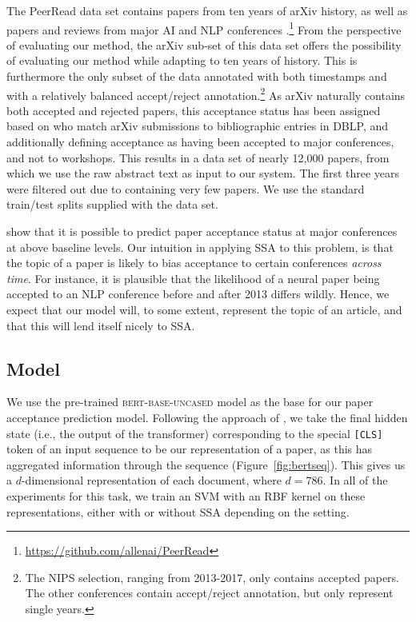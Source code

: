 \documentclass[letterpaper]{article} %
\begin{document}
The PeerRead data set contains papers from ten years of arXiv history, as well as papers and reviews from major AI and NLP conferences \cite{kang18naacl}.\footnote{\url{https://github.com/allenai/PeerRead}} 
From the perspective of evaluating our method, the arXiv sub-set of this data set offers the possibility of evaluating our method while adapting to ten years of history.
This is furthermore the only subset of the data annotated with both timestamps and with a relatively balanced accept/reject annotation.\footnote{The NIPS selection, ranging from 2013-2017, only contains accepted papers. The other conferences contain accept/reject annotation, but only represent single years.}
As arXiv naturally contains both accepted and rejected papers, this acceptance status has been assigned based on \citeauthor{sutton:2017} who match arXiv submissions to bibliographic entries in DBLP, and additionally defining acceptance as having been accepted to major conferences, and not to workshops.
This results in a data set of nearly 12,000 papers, from which we use the raw abstract text as input to our system. The first three years were filtered out due to containing very few papers.
We use the standard train/test splits supplied with the data set.

\citeauthor{kang18naacl} show that it is possible to predict paper acceptance status at major conferences at above baseline levels.
Our intuition in applying SSA to this problem, is that the topic of a paper is likely to bias acceptance to certain conferences \textit{across time}.
For instance, it is plausible that the likelihood of a neural paper being accepted to an NLP conference before and after 2013 differs wildly.
Hence, we expect that our model will, to some extent, represent the topic of an article, and that this will lend itself nicely to SSA.

\subsection{Model}
We use the pre-trained \textsc{bert-base-uncased} model as the base for our paper acceptance prediction model.
Following the approach of \citeauthor{bert}, we take the final hidden state (i.e., the output of the transformer) corresponding to the special \texttt{[CLS]} token of an input sequence to be our representation of a paper, as this has aggregated information through the sequence (Figure~\ref{fig:bertseq}).
This gives us a $d$-dimensional representation of each document, where $d=786$.
In all of the experiments for this task, we train an SVM with an RBF kernel on these representations, either with or without SSA depending on the setting.
\end{document}
